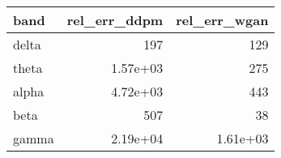 \begin{tabular}{lrr}
\toprule
band & rel_err_ddpm & rel_err_wgan \\
\midrule
delta & 197 & 129 \\
theta & 1.57e+03 & 275 \\
alpha & 4.72e+03 & 443 \\
beta & 507 & 38 \\
gamma & 2.19e+04 & 1.61e+03 \\
\bottomrule
\end{tabular}
